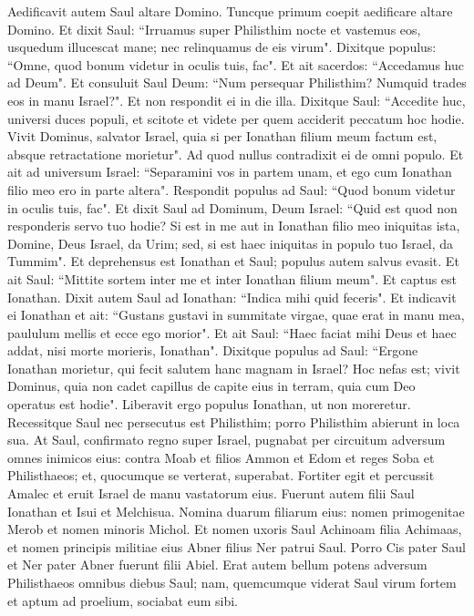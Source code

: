 \begin{biblechapter}
\verse Aedificavit autem Saul altare Domino. Tuncque primum coepit aedificare altare Domino. 
\verse Et dixit Saul: “Irruamus super Philisthim nocte et vastemus eos, usquedum illucescat mane; nec relinquamus de eis virum". Dixitque populus: “Omne, quod bonum videtur in oculis tuis, fac". Et ait sacerdos: “Accedamus huc ad Deum".  
\verse Et consuluit Saul Deum: “Num persequar Philisthim? Numquid trades eos in manu Israel?". Et non respondit ei in die illa. 
\verse Dixitque Saul: “Accedite huc, universi duces populi, et scitote et videte per quem acciderit peccatum hoc hodie. 
\verse Vivit Dominus, salvator Israel, quia si per Ionathan filium meum factum est, absque retractatione morietur". Ad quod nullus contradixit ei de omni populo. 
\verse Et ait ad universum Israel: “Separamini vos in partem unam, et ego cum Ionathan filio meo ero in parte altera". Respondit populus ad Saul: “Quod bonum videtur in oculis tuis, fac". 
\verse Et dixit Saul ad Dominum, Deum Israel: “Quid est quod non responderis servo tuo hodie? Si est in me aut in Ionathan filio meo iniquitas ista, Domine, Deus Israel, da Urim; sed, si est haec iniquitas in populo tuo Israel, da Tummim". Et deprehensus est Ionathan et Saul; populus autem salvus evasit. 
\verse Et ait Saul: “Mittite sortem inter me et inter Ionathan filium meum". Et captus est Ionathan. 
\verse Dixit autem Saul ad Ionathan: “Indica mihi quid feceris". Et indicavit ei Ionathan et ait: “Gustans gustavi in summitate virgae, quae erat in manu mea, paululum mellis et ecce ego morior". 
\verse Et ait Saul: “Haec faciat mihi Deus et haec addat, nisi morte morieris, Ionathan". 
\verse Dixitque populus ad Saul: “Ergone Ionathan morietur, qui fecit salutem hanc magnam in Israel? Hoc nefas est; vivit Dominus, quia non cadet capillus de capite eius in terram, quia cum Deo operatus est hodie". Liberavit ergo populus Ionathan, ut non moreretur. 
\verse Recessitque Saul nec persecutus est Philisthim; porro Philisthim abierunt in loca sua. 
\verse At Saul, confirmato regno super Israel, pugnabat per circuitum adversum omnes inimicos eius: contra Moab et filios Ammon et Edom et reges Soba et Philisthaeos; et, quocumque se verterat, superabat. 
\verse Fortiter egit et percussit Amalec et eruit Israel de manu vastatorum eius. 
\verse Fuerunt autem filii Saul Ionathan et Isui et Melchisua. Nomina duarum filiarum eius: nomen primogenitae Merob et nomen minoris Michol. 
\verse Et nomen uxoris Saul Achinoam filia Achimaas, et nomen principis militiae eius Abner filius Ner patrui Saul. 
\verse Porro Cis pater Saul et Ner pater Abner fuerunt filii Abiel. 
\verse Erat autem bellum potens adversum Philisthaeos omnibus diebus Saul; nam, quemcumque viderat Saul virum fortem et aptum ad proelium, sociabat eum sibi. 
\end{biblechapter}


